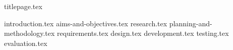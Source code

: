 \documentclass[12pt]{article}
\begin{document}
	{titlepage.tex}
	\tableofcontents
	\thispagestyle{empty}
	\cleardoublepage
	\setcounter{page}{1}

	{introduction.tex}
	{aims-and-objectives.tex}
	{research.tex}
	{planning-and-methodology.tex}
	{requirements.tex}
	{design.tex} 
	{development.tex} 
	{testing.tex} 
	{evaluation.tex} 
	
	\newpage
	\printbibliography
\end{document}
